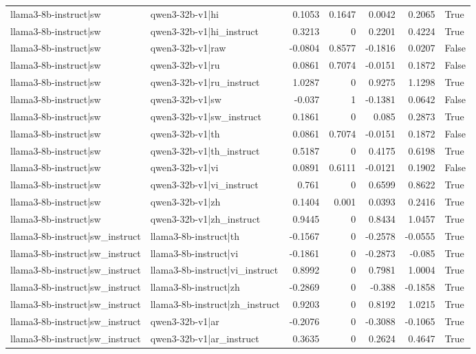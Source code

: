 \begin{table}
\begin{tabular}{l l r r r r l}
llama3-8b-instruct|sw & qwen3-32b-v1|hi & 0.1053 & 0.1647 & 0.0042 & 0.2065 & True \\
llama3-8b-instruct|sw & qwen3-32b-v1|hi_instruct & 0.3213 & 0 & 0.2201 & 0.4224 & True \\
llama3-8b-instruct|sw & qwen3-32b-v1|raw & -0.0804 & 0.8577 & -0.1816 & 0.0207 & False \\
llama3-8b-instruct|sw & qwen3-32b-v1|ru & 0.0861 & 0.7074 & -0.0151 & 0.1872 & False \\
llama3-8b-instruct|sw & qwen3-32b-v1|ru_instruct & 1.0287 & 0 & 0.9275 & 1.1298 & True \\
llama3-8b-instruct|sw & qwen3-32b-v1|sw & -0.037 & 1 & -0.1381 & 0.0642 & False \\
llama3-8b-instruct|sw & qwen3-32b-v1|sw_instruct & 0.1861 & 0 & 0.085 & 0.2873 & True \\
llama3-8b-instruct|sw & qwen3-32b-v1|th & 0.0861 & 0.7074 & -0.0151 & 0.1872 & False \\
llama3-8b-instruct|sw & qwen3-32b-v1|th_instruct & 0.5187 & 0 & 0.4175 & 0.6198 & True \\
llama3-8b-instruct|sw & qwen3-32b-v1|vi & 0.0891 & 0.6111 & -0.0121 & 0.1902 & False \\
llama3-8b-instruct|sw & qwen3-32b-v1|vi_instruct & 0.761 & 0 & 0.6599 & 0.8622 & True \\
llama3-8b-instruct|sw & qwen3-32b-v1|zh & 0.1404 & 0.001 & 0.0393 & 0.2416 & True \\
llama3-8b-instruct|sw & qwen3-32b-v1|zh_instruct & 0.9445 & 0 & 0.8434 & 1.0457 & True \\
llama3-8b-instruct|sw_instruct & llama3-8b-instruct|th & -0.1567 & 0 & -0.2578 & -0.0555 & True \\
llama3-8b-instruct|sw_instruct & llama3-8b-instruct|vi & -0.1861 & 0 & -0.2873 & -0.085 & True \\
llama3-8b-instruct|sw_instruct & llama3-8b-instruct|vi_instruct & 0.8992 & 0 & 0.7981 & 1.0004 & True \\
llama3-8b-instruct|sw_instruct & llama3-8b-instruct|zh & -0.2869 & 0 & -0.388 & -0.1858 & True \\
llama3-8b-instruct|sw_instruct & llama3-8b-instruct|zh_instruct & 0.9203 & 0 & 0.8192 & 1.0215 & True \\
llama3-8b-instruct|sw_instruct & qwen3-32b-v1|ar & -0.2076 & 0 & -0.3088 & -0.1065 & True \\
llama3-8b-instruct|sw_instruct & qwen3-32b-v1|ar_instruct & 0.3635 & 0 & 0.2624 & 0.4647 & True \\

\end{tabular}
\end{table}
